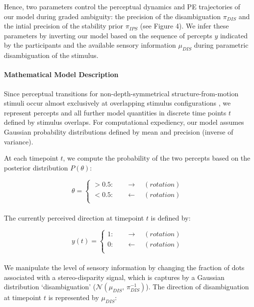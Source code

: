 \documentclass[12pt]{article}
\begin{document}
Hence, two parameters control the perceptual dynamics and PE trajectories of our model during graded ambiguity: the precision of the disambiguation $\pi_{DIS}$ and the intial precision of the stability prior $\pi_{IPS}$ (see Figure 4). We infer these parameters by inverting our model based on the sequence of percepts $y$ indicated by the participants and the available sensory information $\mu_{DIS}$ during parametric disambiguation of the stimulus. 

\paragraph{Mathematical Model Description}

Since perceptual transitions for non-depth-symmetrical structure-from-motion stimuli occur almost exclusively at overlapping stimulus configurations \parencite{Pastukhov2012a, Weilnhammer2013, Weilnhammer2014}, we represent percepts and all further model quantities in discrete time points $t$ defined by stimulus overlaps. For computational expediency, our model assumes Gaussian probability distributions defined by mean and precision (inverse of variance).

At each timepoint $t$, we compute the probability of the two percepts based on the posterior distribution $P(\theta)$:

\begin{equation}
\theta = 
\begin{cases}
>0.5:& \quad \rightarrow \quad (rotation) \\
<0.5:&  \quad \leftarrow \quad (rotation) \\
\end{cases}
\end{equation} \\

The currently perceived direction at timepoint $t$ is defined by:

\begin{equation}
y(t) = 
\begin{cases}
1:& \quad \rightarrow \quad (rotation) \\
0:&  \quad \leftarrow \quad (rotation) \\
\end{cases}
\end{equation} \\

We manipulate the level of sensory information by changing the fraction of dots associated with a stereo-disparity signal, which is captures by a Gaussian distribution ‘disambiguation’ ($\mathcal{N}(\mu_{DIS},\,\pi_{DIS}^{-1})$). The direction of disambiguation at timepoint $t$ is represented by $\mu_{DIS}$:
\end{document}

